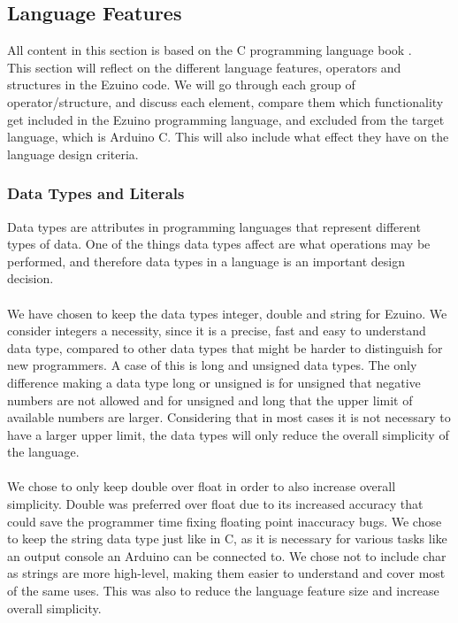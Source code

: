 \subsection{Language Features}
\label{language-features}
All content in this section is based on the C programming language book \cite{kernighan1988c}.\\
This section will reflect on the different language features, operators and structures in the Ezuino code. We will go through each group of operator/structure, and discuss each element, compare them which functionality get included in the Ezuino programming language, and excluded from the target language, which is Arduino C. This will also include what effect they have on the language design criteria.\\
\subsubsection*{Data Types and Literals}
Data types are attributes in programming languages that represent different types of data. One of the things data types affect are what operations may be performed, and therefore data types in a language is an important design decision.
\\ \\
We have chosen to keep the data types integer, double and string for Ezuino. We consider integers a necessity, since it is a precise, fast and easy to understand data type, compared to other data types that might be harder to distinguish for new programmers. A case of this is long and unsigned data types. The only difference making a data type long or unsigned is for unsigned that negative numbers are not allowed and for unsigned and long that the upper limit of available numbers are larger. Considering that in most cases it is not necessary to have a larger upper limit, the data types will only reduce the overall simplicity of the language.
\\ \\
We chose to only keep double over float in order to also increase overall simplicity. Double was preferred over float due to its increased accuracy that could save the programmer time fixing floating point inaccuracy bugs. We chose to keep the string data type just like in C, as it is necessary for various tasks like an output console an Arduino can be connected to. We chose not to include char as strings are more high-level, making them easier to understand and cover most of the same uses. This was also to reduce the language feature size and increase overall simplicity.
